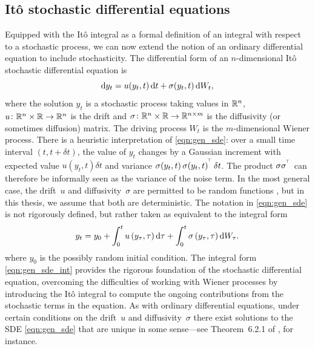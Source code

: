 \subsection{It\^o stochastic differential equations}\label{sec:bkg_sde}
Equipped with the It\^o integral as a formal definition of an integral with respect to a stochastic process, we can now extend the notion of an ordinary differential equation to include stochasticity.
The differential form of an \(n\)-dimensional It\^o stochastic differential equation is
\begin{equation}
	\dif y_t = u\!\left(y_t, t\right)\dif t + \sigma\!\left(y_t, t\right)\dif W_t,
	\label{eqn:gen_sde}
\end{equation}
where the solution \(y_t\) is a stochastic process taking values in \(\mathbb{R}^n\), \(u\colon \mathbb{R}^n \times \mathbb{R} \to \mathbb{R}^n\) is the drift and \(\sigma\colon \mathbb{R}^n \times \mathbb{R} \to \mathbb{R}^{n\times m}\) is the diffusivity (or sometimes diffusion) matrix.
The driving process \(W_t\) is the \(m\)-dimensional Wiener process.
There is a heuristic interpretation of \cref{eqn:gen_sde}: over a small time interval \(\left(t, t + \delta t\right)\), the value of \(y_t\) changes by a Gaussian increment with expected value \(u\!\left(y_t, t\right)\delta t\) and variance \(\sigma\!\left(y_t, t\right)\sigma\!\left(y_t, t\right)^{^{\!\top}}\delta t\).
The product \(\sigma\sigma^{^{\!\top}}\) can therefore be informally seen as the variance of the noise term.
In the most general case, the drift~\(u\) and diffusivity~\(\sigma\) are permitted to be random functions \citep{KallianpurSundar_2014_StochasticAnalysisDiffusion}, but in this thesis, we assume that both are deterministic.
The notation in \cref{eqn:gen_sde} is not rigorously defined, but rather taken as equivalent to the integral form
\begin{equation}\label{eqn:gen_sde_int}
	y_t = y_0 + \int_0^t{u\left(y_\tau, \tau\right)\dif\tau} + \int_0^t{\sigma\left(y_\tau, \tau\right)\dif W_\tau}.
\end{equation}
where \(y_0\) is the possibly random initial condition.
The integral form \cref{eqn:gen_sde_int} provides the rigorous foundation of the stochastic differential equation, overcoming the difficulties of working with Wiener processes by introducing the It\^o integral to compute the ongoing contributions from the stochastic terms in the equation.
As with ordinary differential equations, under certain conditions on the drift~\(u\) and diffusivity~\(\sigma\) there exist solutions to the SDE \cref{eqn:gen_sde} that are unique in some sense---see Theorem~6.2.1 of \citet{KallianpurSundar_2014_StochasticAnalysisDiffusion}, for instance.

